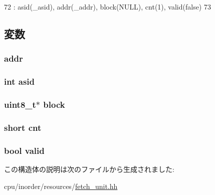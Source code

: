 \begin{DoxyCode}
72             : asid(_asid), addr(_addr), block(NULL), cnt(1), valid(false)
73         { }
\end{DoxyCode}


\subsection{変数}
\hypertarget{structFetchUnit_1_1FetchBlock_a0bb77b4ba61e408313e1118250f9278c}{
\subsubsection[{addr}]{ {\bf addr}}}
\label{structFetchUnit_1_1FetchBlock_a0bb77b4ba61e408313e1118250f9278c}
\hypertarget{structFetchUnit_1_1FetchBlock_a3651868e9554e283ffdc0fb7631a934b}{
\subsubsection[{asid}]{\setlength{\rightskip}{0pt plus 5cm}int {\bf asid}}}
\label{structFetchUnit_1_1FetchBlock_a3651868e9554e283ffdc0fb7631a934b}
\hypertarget{structFetchUnit_1_1FetchBlock_a7011471cf10a6c24c9a0bce6e598970b}{
\subsubsection[{block}]{\setlength{\rightskip}{0pt plus 5cm}uint8\_\-t$\ast$ {\bf block}}}
\label{structFetchUnit_1_1FetchBlock_a7011471cf10a6c24c9a0bce6e598970b}
\hypertarget{structFetchUnit_1_1FetchBlock_abc9543cb3f5442a6d291a5e8e5e2efa5}{
\subsubsection[{cnt}]{\setlength{\rightskip}{0pt plus 5cm}short {\bf cnt}}}
\label{structFetchUnit_1_1FetchBlock_abc9543cb3f5442a6d291a5e8e5e2efa5}
\hypertarget{structFetchUnit_1_1FetchBlock_a28e3c179a86f337095088b3ca02a2b2a}{
\subsubsection[{valid}]{\setlength{\rightskip}{0pt plus 5cm}bool {\bf valid}}}
\label{structFetchUnit_1_1FetchBlock_a28e3c179a86f337095088b3ca02a2b2a}


この構造体の説明は次のファイルから生成されました:\begin{DoxyCompactItemize}
\item 
cpu/inorder/resources/\hyperlink{fetch__unit_8hh}{fetch\_\-unit.hh}\end{DoxyCompactItemize}

